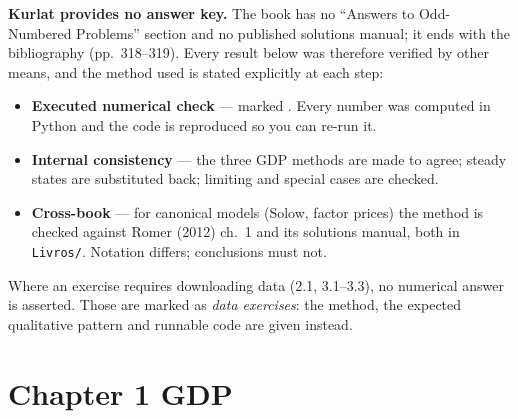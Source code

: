 \documentclass[12pt, letterpaper]{article}
\begin{document}
\begin{titlepage}
\vfill
\begin{tcolorbox}[colback=red!4,colframe=red!50,arc=2pt,width=0.88\textwidth,
  title={\bfseries\small On verification --- please read},fonttitle=\color{red!60!black}]
\small
\textbf{Kurlat provides no answer key.} The book has no ``Answers to Odd-Numbered
Problems'' section and no published solutions manual; it ends with the bibliography
(pp.~318--319). Every result below was therefore verified by other means, and the
method used is stated explicitly at each step:
\begin{itemize}[leftmargin=1.2em,itemsep=2pt,topsep=3pt]
\item \textbf{Executed numerical check} --- marked \checkmark. Every number was computed
      in Python and the code is reproduced so you can re-run it.
\item \textbf{Internal consistency} --- the three GDP methods are made to agree; steady
      states are substituted back; limiting and special cases are checked.
\item \textbf{Cross-book} --- for canonical models (Solow, factor prices) the method is
      checked against Romer (2012) ch.~1 and its solutions manual, both in
      \texttt{Livros/}. Notation differs; conclusions must not.
\end{itemize}
Where an exercise requires downloading data (2.1, 3.1--3.3), no numerical answer is
asserted. Those are marked as \emph{data exercises}: the method, the expected
qualitative pattern and runnable code are given instead.
\end{tcolorbox}
\vspace{1cm}
\end{titlepage}

\tableofcontents
\newpage

\section{Chapter 1 \quad GDP}
\end{document}

